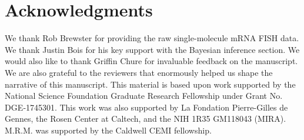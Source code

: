 \section*{Acknowledgments}

We thank Rob Brewster for providing the raw single-molecule mRNA FISH data. We
thank Justin Bois for his key support with the Bayesian inference section. We
would also like to thank Griffin Chure for invaluable feedback on the
manuscript. We are also grateful to the reviewers that enormously helped us
shape the narrative of this manuscript. This material is based upon work
supported by the National Science Foundation Graduate Research Fellowship under
Grant No. DGE‐1745301. This work was also supported by La Fondation
Pierre-Gilles de Gennes, the Rosen Center at Caltech, and the NIH 1R35 GM118043
(MIRA). M.R.M. was supported by the Caldwell CEMI fellowship. 